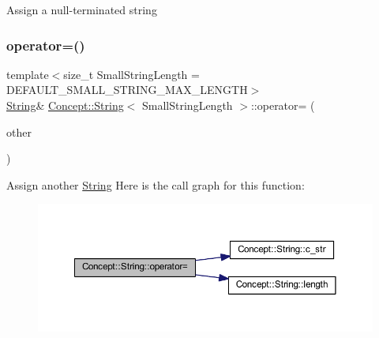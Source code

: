 Assign a null-\/terminated string \mbox{\label{class_concept_1_1_string_a24a0fb7e31e8be92592ad212b9255166}} 
\subsubsection{\texorpdfstring{operator=()}{operator=()}\hspace{0.1cm}{\footnotesize\ttfamily [2/3]}}
{\footnotesize\ttfamily template$<$size\+\_\+t Small\+String\+Length = D\+E\+F\+A\+U\+L\+T\+\_\+\+S\+M\+A\+L\+L\+\_\+\+S\+T\+R\+I\+N\+G\+\_\+\+M\+A\+X\+\_\+\+L\+E\+N\+G\+TH$>$ \\
\mbox{\hyperlink{class_concept_1_1_string}{String}}\& \mbox{\hyperlink{class_concept_1_1_string}{Concept\+::\+String}}$<$ Small\+String\+Length $>$\+::operator= (\begin{DoxyParamCaption}\item[{const \mbox{\hyperlink{class_concept_1_1_string}{String}}$<$ Small\+String\+Length $>$ \&}]{other }\end{DoxyParamCaption})\hspace{0.3cm}{\ttfamily [inline]}}

Assign another \mbox{\hyperlink{class_concept_1_1_string}{String}} Here is the call graph for this function\+:\nopagebreak
\begin{figure}[H]
\begin{center}
\leavevmode
\includegraphics[width=350pt]{class_concept_1_1_string_a24a0fb7e31e8be92592ad212b9255166_cgraph}
\end{center}
\end{figure}
\mbox{\label{class_concept_1_1_string_a42293f97a2fc075a85ec90b5e9850d31}} 
